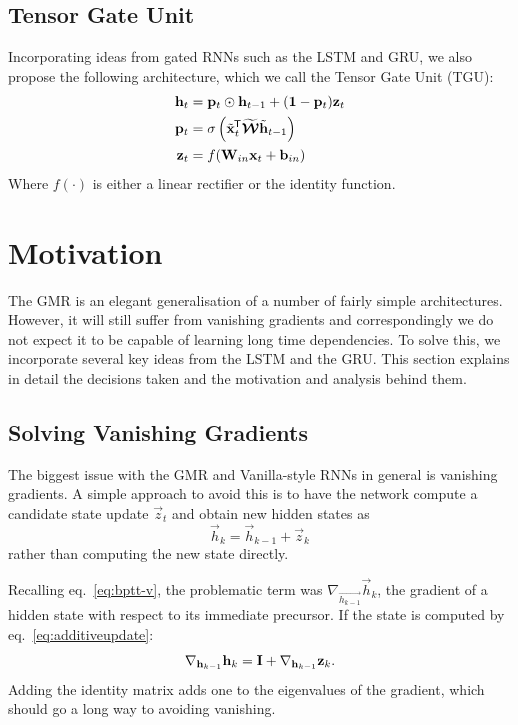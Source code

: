 \subsection{Tensor Gate Unit}
Incorporating ideas from gated RNNs such as the LSTM and GRU, we also propose the following architecture,
which we call the Tensor Gate Unit (TGU):
\begin{align}\label{eq:tgu}
	\mathbf{h}_t &= \mathbf{p}_t \odot \mathbf{h}_{t-1} + (\mathbf{1}-\mathbf{p}_t)\mathbf{z}_t \\
	\mathbf{p}_t &= \sigma\left(\tilde{\mathbf{x}}^{\mkern-1.5mu\mathsf{T}}_t\widetilde{\bm{\mathcal{W}}}\tilde{\mathbf{h}}_{t-1} \right)\\
	\mathbf{z}_t &= f(\mathbf{W}_{in}\mathbf{x}_t + \mathbf{b}_{in})
\end{align}
Where \(f(\cdot)\) is either a linear rectifier or the identity function.

\section{Motivation}
The GMR is an elegant generalisation of a number of fairly simple architectures. However, it will
still suffer from vanishing gradients and correspondingly we do not expect it to be capable of
learning long time dependencies. To solve this, we incorporate several
key ideas from the LSTM and the GRU. This section explains in detail the decisions taken and
the motivation and analysis behind them.

\subsection{Solving Vanishing Gradients}\label{sec:additive}
The biggest issue with the GMR and Vanilla-style RNNs in general is vanishing gradients.
A simple approach to avoid this
 is to have the network compute a candidate state update
\(\vec{z}_t\) and obtain new hidden states as
\begin{equation}\label{eq:additiveupdate}
	\vec{h}_k = \vec{h}_{k-1} + \vec{z}_k
\end{equation} rather than computing the new state directly.

Recalling eq.~\eqref{eq:bptt-v}, the problematic term was \(\nabla_{\vec{h_{k-1}}}\vec{h}_k\),
the gradient of a hidden state with respect to its immediate precursor. If the state is computed by
eq.~\eqref{eq:additiveupdate}:
\begin{equation}\label{eq:additivegrad}
	\nabla_{\mathbf{h}_{k-1}}\mathbf{h}_k = \mathbf{I} + \nabla_{\mathbf{h}_{k-1}}\mathbf{z}_k.
\end{equation} Adding the identity matrix adds one to the eigenvalues of the gradient, which should go
a long way to avoiding vanishing.


